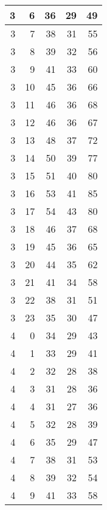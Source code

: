 \begin{longtable}{|r|r|r|r|r|}
    \hline
    3     & 6     & 36    & 29    & 49 \\
    \hline
    3     & 7     & 38    & 31    & 55 \\
    \hline
    3     & 8     & 39    & 32    & 56 \\
    \hline
    3     & 9     & 41    & 33    & 60 \\
    \hline
    3     & 10    & 45    & 36    & 66 \\
    \hline
    3     & 11    & 46    & 36    & 68 \\
    \hline
    3     & 12    & 46    & 36    & 67 \\
    \hline
    3     & 13    & 48    & 37    & 72 \\
    \hline
    3     & 14    & 50    & 39    & 77 \\
    \hline
    3     & 15    & 51    & 40    & 80 \\
    \hline
    3     & 16    & 53    & 41    & 85 \\
    \hline
    3     & 17    & 54    & 43    & 80 \\
    \hline
    3     & 18    & 46    & 37    & 68 \\
    \hline
    3     & 19    & 45    & 36    & 65 \\
    \hline
    3     & 20    & 44    & 35    & 62 \\
    \hline
    3     & 21    & 41    & 34    & 58 \\
    \hline
    3     & 22    & 38    & 31    & 51 \\
    \hline
    3     & 23    & 35    & 30    & 47 \\
    \hline
    4     & 0     & 34    & 29    & 43 \\
    \hline
    4     & 1     & 33    & 29    & 41 \\
    \hline
    4     & 2     & 32    & 28    & 38 \\
    \hline
    4     & 3     & 31    & 28    & 36 \\
    \hline
    4     & 4     & 31    & 27    & 36 \\
    \hline
    4     & 5     & 32    & 28    & 39 \\
    \hline
    4     & 6     & 35    & 29    & 47 \\
    \hline
    4     & 7     & 38    & 31    & 53 \\
    \hline
    4     & 8     & 39    & 32    & 54 \\
    \hline
    4     & 9     & 41    & 33    & 58 \\

\end{longtable}
